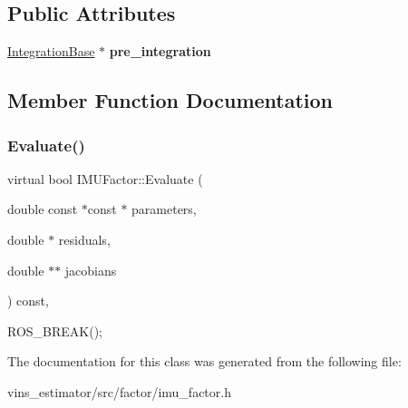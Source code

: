 \subsection*{Public Attributes}
\begin{DoxyCompactItemize}
\item 
\mbox{\label{classIMUFactor_aece00522f8792061d5ecb62621a9f7c4}} 
\hyperlink{classIntegrationBase}{Integration\+Base} $\ast$ {\bfseries pre\+\_\+integration}
\end{DoxyCompactItemize}


\subsection{Member Function Documentation}
\mbox{\label{classIMUFactor_a7d49766bb73f577bcd11efdd31f7fc8b}} 
\subsubsection{\texorpdfstring{Evaluate()}{Evaluate()}}
{\footnotesize\ttfamily virtual bool I\+M\+U\+Factor\+::\+Evaluate (\begin{DoxyParamCaption}\item[{double const $\ast$const $\ast$}]{parameters,  }\item[{double $\ast$}]{residuals,  }\item[{double $\ast$$\ast$}]{jacobians }\end{DoxyParamCaption}) const\hspace{0.3cm}{\ttfamily [inline]}, {\ttfamily [virtual]}}

R\+O\+S\+\_\+\+B\+R\+E\+A\+K(); 

The documentation for this class was generated from the following file\+:\begin{DoxyCompactItemize}
\item 
vins\+\_\+estimator/src/factor/imu\+\_\+factor.\+h\end{DoxyCompactItemize}
